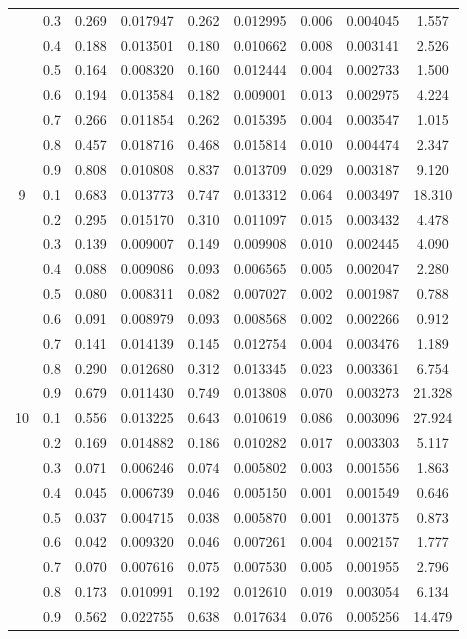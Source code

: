 \begin{longtable}{ | c | c || c | c | c | c | c | c | c | }
 & 0.3 & 0.269 & 0.017947 & 0.262 & 0.012995 & 0.006 & 0.004045 & 1.557 \\
 & 0.4 & 0.188 & 0.013501 & 0.180 & 0.010662 & 0.008 & 0.003141 & 2.526 \\
 & 0.5 & 0.164 & 0.008320 & 0.160 & 0.012444 & 0.004 & 0.002733 & 1.500 \\
 & 0.6 & 0.194 & 0.013584 & 0.182 & 0.009001 & 0.013 & 0.002975 & 4.224 \\
 & 0.7 & 0.266 & 0.011854 & 0.262 & 0.015395 & 0.004 & 0.003547 & 1.015 \\
 & 0.8 & 0.457 & 0.018716 & 0.468 & 0.015814 & 0.010 & 0.004474 & 2.347 \\
 & 0.9 & 0.808 & 0.010808 & 0.837 & 0.013709 & 0.029 & 0.003187 & 9.120 \\
 \hline
\multirow{9}{*}{9} & 0.1 & 0.683 & 0.013773 & 0.747 & 0.013312 & 0.064 & 0.003497 & 18.310 \\
 & 0.2 & 0.295 & 0.015170 & 0.310 & 0.011097 & 0.015 & 0.003432 & 4.478 \\
 & 0.3 & 0.139 & 0.009007 & 0.149 & 0.009908 & 0.010 & 0.002445 & 4.090 \\
 & 0.4 & 0.088 & 0.009086 & 0.093 & 0.006565 & 0.005 & 0.002047 & 2.280 \\
 & 0.5 & 0.080 & 0.008311 & 0.082 & 0.007027 & 0.002 & 0.001987 & 0.788 \\
 & 0.6 & 0.091 & 0.008979 & 0.093 & 0.008568 & 0.002 & 0.002266 & 0.912 \\
 & 0.7 & 0.141 & 0.014139 & 0.145 & 0.012754 & 0.004 & 0.003476 & 1.189 \\
 & 0.8 & 0.290 & 0.012680 & 0.312 & 0.013345 & 0.023 & 0.003361 & 6.754 \\
 & 0.9 & 0.679 & 0.011430 & 0.749 & 0.013808 & 0.070 & 0.003273 & 21.328 \\
 \hline
\multirow{9}{*}{10} & 0.1 & 0.556 & 0.013225 & 0.643 & 0.010619 & 0.086 & 0.003096 & 27.924 \\
 & 0.2 & 0.169 & 0.014882 & 0.186 & 0.010282 & 0.017 & 0.003303 & 5.117 \\
 & 0.3 & 0.071 & 0.006246 & 0.074 & 0.005802 & 0.003 & 0.001556 & 1.863 \\
 & 0.4 & 0.045 & 0.006739 & 0.046 & 0.005150 & 0.001 & 0.001549 & 0.646 \\
 & 0.5 & 0.037 & 0.004715 & 0.038 & 0.005870 & 0.001 & 0.001375 & 0.873 \\
 & 0.6 & 0.042 & 0.009320 & 0.046 & 0.007261 & 0.004 & 0.002157 & 1.777 \\
 & 0.7 & 0.070 & 0.007616 & 0.075 & 0.007530 & 0.005 & 0.001955 & 2.796 \\
 & 0.8 & 0.173 & 0.010991 & 0.192 & 0.012610 & 0.019 & 0.003054 & 6.134 \\
 & 0.9 & 0.562 & 0.022755 & 0.638 & 0.017634 & 0.076 & 0.005256 & 14.479 \\
 \hline
\hline
\end{longtable}
 
